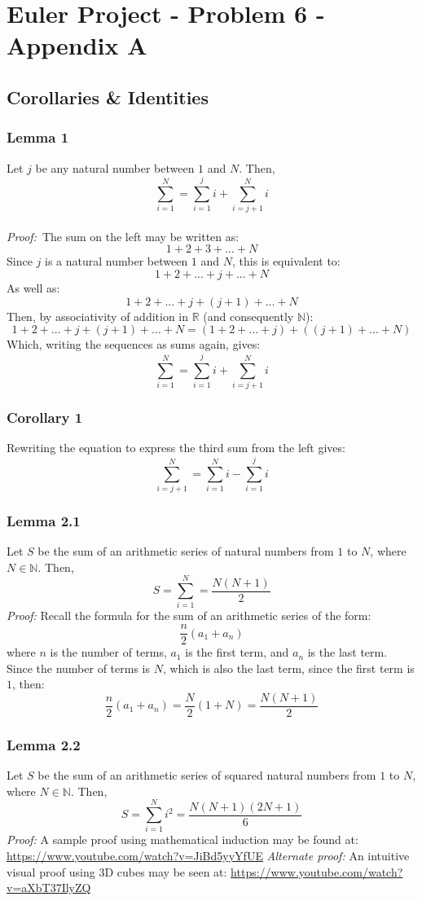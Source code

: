 \documentclass[]{article}
\begin{document}
\allowdisplaybreaks
\raggedbottom
\section*{Euler Project - Problem 6 - Appendix A}
\subsection*{Corollaries \& Identities}
\subsubsection*{Lemma 1}
Let $j$ be any natural number between $1$ and $N$. Then,
\[\sum_{i=1}^{N}=\sum_{i=1}^{j}i + \sum_{i=j+1}^{N}i\]\\
\textit{Proof:}\
The sum on the left may be written as:
\[1 + 2 + 3 + ... + N\]
Since $j$ is a natural number between $1$ and $N$, this is equivalent to: 
\[1 + 2 + ... + j + ... + N\]
As well as:
\[1 + 2 + ... + j + (j+1) + ... + N\]
Then, by associativity of addition in $\mathbb{R}$ (and consequently $\mathbb{N}$):
\[1 + 2 + ... + j + (j+1) + ... + N = (1 + 2 + ... + j) + ((j+1) + ... + N)\]
Which, writing the sequences as sums again, gives:
\[\sum_{i=1}^{N}=\sum_{i=1}^{j}i + \sum_{i=j+1}^{N}i\]

\subsubsection*{Corollary 1}
Rewriting the equation to express the third sum from the left gives:
\[\sum_{i=j+1}^{N}=\sum_{i=1}^{N}i-\sum_{i=1}^{j}i\]

\subsubsection*{Lemma 2.1}
Let $S$ be the sum of an arithmetic series of natural numbers from $1$ to $N$, where $N \in \mathbb{N}$. Then,
\[S=\sum_{i=1}^{N}=\frac{N(N+1)}{2}\]
\textit{Proof:} Recall the formula for the sum of an arithmetic series of the form:
\[\frac{n}{2}(a_1 + a_n)\]
where $n$ is the number of terms, $a_1$ is the first term, and $a_n$ is the last term.\\
Since the number of terms is $N$, which is also the last term, since the first term is $1$, then:
\[\frac{n}{2}(a_1 + a_n) = \frac{N}{2}(1 + N) = \frac{N(N+1)}{2}\]

\subsubsection*{Lemma 2.2}
Let $S$ be the sum of an arithmetic series of squared natural numbers from $1$ to $N$, where $N \in \mathbb{N}$. Then,
\[S=\sum_{i=1}^{N}i^2=\frac{N(N+1)(2N+1)}{6}\]
\textit{Proof:} A sample proof using mathematical induction may be found at: \url{https://www.youtube.com/watch?v=JiBd5yyYfUE}
\textit{Alternate proof:} An intuitive visual proof using 3D cubes may be seen at: \url{https://www.youtube.com/watch?v=aXbT37IlyZQ}
\end{document}
